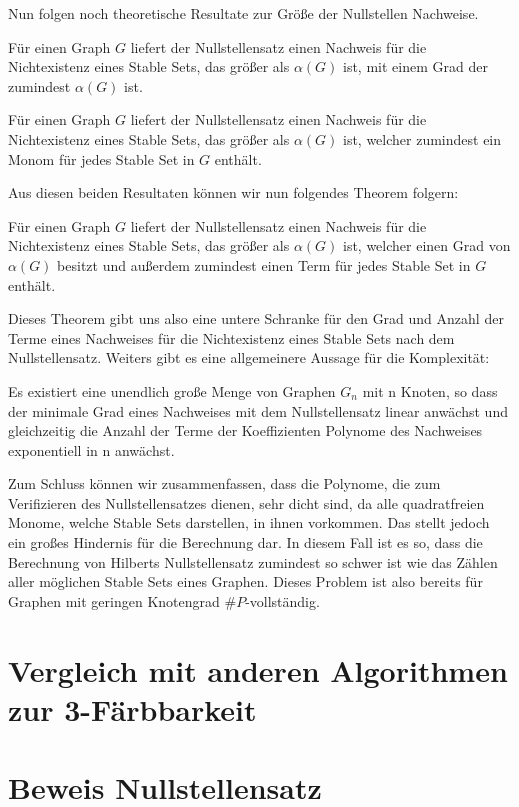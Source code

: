\noindent Nun folgen noch theoretische Resultate zur Größe der Nullstellen Nachweise.

\begin{theorem}
Für einen Graph $G$ liefert der Nullstellensatz einen Nachweis für die Nichtexistenz eines Stable Sets, das größer als $\alpha(G)$ ist, mit einem Grad der zumindest $\alpha(G)$ ist.
\end{theorem}

\begin{corollary}
Für einen Graph $G$ liefert der Nullstellensatz einen Nachweis für die Nichtexistenz eines Stable Sets, das größer als $\alpha(G)$ ist, welcher zumindest ein Monom für jedes Stable Set in $G$ enthält.
\end{corollary}

\noindent Aus diesen beiden Resultaten können wir nun folgendes Theorem folgern:

\begin{theorem}
Für einen Graph $G$ liefert der Nullstellensatz einen Nachweis für die Nichtexistenz eines Stable Sets, das größer als $\alpha(G)$ ist, welcher einen Grad von $\alpha(G)$ besitzt und außerdem zumindest einen Term für jedes Stable Set in $G$ enthält.
\end{theorem}

\noindent Dieses Theorem gibt uns also eine untere Schranke für den Grad und Anzahl der Terme eines Nachweises für die Nichtexistenz eines Stable Sets nach dem Nullstellensatz. Weiters gibt es eine allgemeinere Aussage für die Komplexität:

\begin{corollary}
Es existiert eine unendlich große Menge von Graphen $G_n$ mit n Knoten, so dass der minimale Grad eines Nachweises mit dem Nullstellensatz linear anwächst und gleichzeitig die Anzahl der Terme der Koeffizienten Polynome des Nachweises exponentiell in n anwächst.
\end{corollary}


\noindent Zum Schluss können wir zusammenfassen, dass die Polynome, die zum Verifizieren des Nullstellensatzes dienen, sehr dicht sind, da alle quadratfreien Monome, welche Stable Sets darstellen, in ihnen vorkommen.
Das stellt jedoch ein großes Hindernis für die Berechnung dar. In diesem Fall ist es so, dass die Berechnung von Hilberts Nullstellensatz zumindest so schwer ist wie das Zählen aller möglichen Stable Sets eines Graphen. Dieses Problem ist also bereits für Graphen mit geringen Knotengrad $\#P$-vollständig. 




\section{Vergleich mit anderen Algorithmen zur 3-Färbbarkeit}



\section{Beweis Nullstellensatz}

